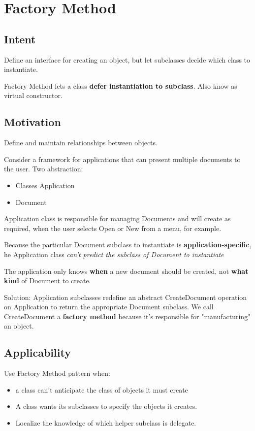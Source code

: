 \documentclass[11pt, a4paper]{book}
\begin{document}
\section{Factory Method}
\subsection{Intent}
Define an interface for creating an object, but let subclasses decide which
class to instantiate.

Factory Method lets a class \textbf{defer instantiation to subclass}. Also know
as virtual constructor.

\subsection{Motivation}
Define and maintain relationships between objects.

Consider a framework for applications that can present multiple documents to the
user. Two abstraction:
\begin{itemize}
\item Classes Application
\item Document
\end{itemize}
Application class is responsible for managing Documents and will create as
required, when the user selects Open or New from a menu, for example.

Because the particular Document subclass to instantiate is
\textbf{application-specific}, he Application class \emph{can't predict the
subclass of Document to instantiate}

The application only knows \textbf{when} a new document should be created, not
\textbf{what kind} of Document to create.

Solution: Application subclasses redefine an abstract CreateDocument operation
on Application to return the appropriate Document subclass. We call
CreateDocument a \textbf{factory method} because it's responsible for
"manufacturing" an object.

\subsection{Applicability}
Use Factory Method pattern when:
\begin{itemize}
\item a class can't anticipate the class of objects it must create
\item A class wants its subclasses to specify the objects it creates.
\item Localize the knowledge of which helper subclass is delegate.
\end{itemize}
\end{document}
